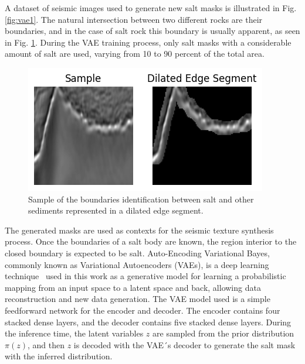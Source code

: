 \documentclass{ieeeaccess}
\providecommand{\DIFdelbegin}{} %
\providecommand{\DIFaddbeginFL}{} %
\providecommand{\DIFaddendFL}{} %
\providecommand{\DIFdelbeginFL}{} %
\providecommand{\DIFdelendFL}{} %
\newcommand{\DIFscaledelfig}{0.5}
\newlength{\DIFdelgraphicswidth} %
\newlength{\DIFdelgraphicsheight} %
\newcommand{\DIFaddincludegraphics}[2][]{{\color{blue}\fbox{\DIFOincludegraphics[#1]{#2}}}} %
\newcommand{\DIFdelincludegraphics}[2][]{%
\sbox{\DIFdelgraphicsbox}{\DIFOincludegraphics[#1]{#2}}%
\settoboxwidth{\DIFdelgraphicswidth}{\DIFdelgraphicsbox} %
\settoboxtotalheight{\DIFdelgraphicsheight}{\DIFdelgraphicsbox} %
\scalebox{\DIFscaledelfig}{%
\parbox[b]{\DIFdelgraphicswidth}{\usebox{\DIFdelgraphicsbox}\\[-\baselineskip] \rule{\DIFdelgraphicswidth}{0em}}\llap{\resizebox{\DIFdelgraphicswidth}{\DIFdelgraphicsheight}{%
\setlength{\unitlength}{\DIFdelgraphicswidth}%
\begin{picture}(1,1)%
\thicklines\linethickness{2pt} %
{\color[rgb]{1,0,0}\put(0,0){\framebox(1,1){}}}%
{\color[rgb]{1,0,0}\put(0,0){\line( 1,1){1}}}%
{\color[rgb]{1,0,0}\put(0,1){\line(1,-1){1}}}%
\end{picture}%
}\hspace*{3pt}}} %
} %
\DeclareRobustCommand{\DIFdelbegin}{\DIFOdelbegin \let\includegraphics\DIFdelincludegraphics} %
\DeclareRobustCommand{\DIFaddbeginFL}{\DIFOaddbeginFL \let\includegraphics\DIFaddincludegraphics} %
\DeclareRobustCommand{\DIFaddendFL}{\DIFOaddendFL \let\includegraphics\DIFOincludegraphics} %
\DeclareRobustCommand{\DIFdelbeginFL}{\DIFOdelbeginFL \let\includegraphics\DIFdelincludegraphics} %
\DeclareRobustCommand{\DIFdelendFL}{\DIFOaddendFL \let\includegraphics\DIFOincludegraphics} %
\begin{document}
A dataset of seismic images used to generate new salt masks is illustrated in Fig. \ref{fig:vae1}. The natural intersection between two different rocks are their boundaries, and in the case of salt rock this boundary is usually apparent, as seen in Fig. \ref{fig:edge1}. During the VAE training process, only salt masks with a considerable amount of salt are used, varying from 10 to 90 percent of the total area.
\begin{figure}
    \centering
    \DIFdelbeginFL %
\DIFdelendFL \DIFaddbeginFL \includegraphics[width=1\linewidth]{images/edge detection.png}
    \DIFaddendFL \caption{Sample of the boundaries identification between salt and other sediments represented in a dilated edge segment.}
    \label{fig:edge1}
\end{figure}

The generated masks are used as contexts for the seismic texture synthesis process. Once the boundaries of a salt body are known, the region interior to the closed boundary is expected to be salt. Auto-Encoding Variational Bayes, commonly known as Variational Autoencoders (VAEs), is a deep learning technique~\cite{ref8} used in this work as a generative model for learning a probabilistic mapping from an input space to a latent space and back, allowing data reconstruction and new data generation. The VAE model used is a simple feedforward network for the encoder and decoder. The encoder contains four stacked dense layers, and the decoder contains five stacked dense layers. During the inference time, the latent variables $z$ are sampled from the prior distribution $\pi(z)$, and then $z$ is decoded with the VAE´s decoder to generate the salt mask with the inferred distribution.

\DIFdelbegin %
\end{document}
